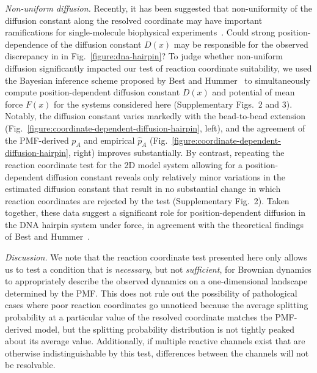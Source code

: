\documentclass[aps,prl,twocolumn,superscriptaddress,floatfix]{revtex4-1}
\begin{document}
\emph{Non-uniform diffusion.}  Recently, it has been suggested that non-uniformity of the diffusion constant along the resolved coordinate may have important ramifications for single-molecule biophysical experiments~\cite{best-hummer:2010:pnas:coordinate-dependent-diffusion}.
Could strong position-dependence of the diffusion constant $D(x)$ may be responsible for the observed discrepancy in in Fig.~\ref{figure:dna-hairpin}?
To judge whether non-uniform diffusion significantly impacted our test of reaction coordinate suitability, we used the Bayesian inference scheme proposed by Best and Hummer~\cite{best-hummer:2010:pnas:coordinate-dependent-diffusion} to simultaneously compute position-dependent diffusion constant $D(x)$ and potential of mean force $F(x)$ for the systems considered here (Supplementary Figs.~2 and 3).
Notably, the diffusion constant varies markedly with the bead-to-bead extension (Fig.~\ref{figure:coordinate-dependent-diffusion-hairpin}, left), and the agreement of the PMF-derived $p_A$ and empirical $\hat{p}_A$ (Fig.~\ref{figure:coordinate-dependent-diffusion-hairpin}, right) improves substantially.
By contrast, repeating the reaction coordinate test for the 2D model system allowing for a position-dependent diffusion constant reveals only relatively minor variations in the estimated diffusion constant that result in no substantial change in which reaction coordinates are rejected by the test (Supplementary Fig.~2).
Taken together, these data suggest a significant role for position-dependent diffusion in the DNA hairpin system under force, in agreement with the theoretical findings of Best and Hummer~\cite{best-hummer:2010:pnas:coordinate-dependent-diffusion}.



\noindent\emph{Discussion.}
We note that the reaction coordinate test presented here only allows us to test a condition that is \emph{necessary}, but not \emph{sufficient}, for Brownian dynamics to appropriately describe the observed dynamics on a one-dimensional landscape determined by the PMF.
This does not rule out the possibility of pathological cases where poor reaction coordinates go unnoticed because the average splitting probability at a particular value of the resolved coordinate matches the PMF-derived model, but the splitting probability distribution is not tightly peaked about its average value.
Additionally, if multiple reactive channels exist that are otherwise indistinguishable by this test, differences between the channels will not be resolvable.
\end{document}
